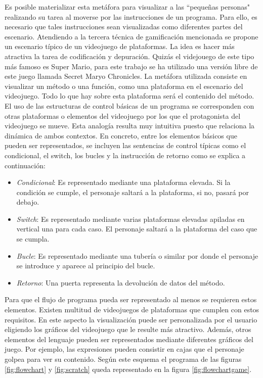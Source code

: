 \documentclass{llncs}
\begin{document}
Es posible materializar esta metáfora para visualizar a las ``pequeñas personas" realizando su tarea al moverse por las instrucciones de un programa. Para ello, es necesario que tales instrucciones sean visualizadas como diferentes partes del escenario. Atendiendo a la tercera técnica de gamificación mencionada se propone un escenario típico de un videojuego de plataformas. La idea es hacer más atractiva la tarea de codificación y depuración. Quizás el videjouego de este tipo más famoso es Super Mario, para este trabajo se ha utilizado una versión libre de este juego llamada Secret Maryo Chronicles. La metáfora utilizada consiste en visualizar un método o una función, como una plataforma en el escenario del videojuego. Todo lo que hay sobre esta plataforma será el contenido del método. El uso de las estructuras de control básicas de un programa se corresponden con otras plataformas o elementos del videojuego por los que el protagonista del videojuego se mueve. Esta analogía resulta muy intuitiva puesto que relaciona la dinámica de ambos contextos. En concreto, entre los elementos básicos que pueden ser representados, se incluyen las sentencias de control típicas como el condicional, el switch, los bucles y la instrucción de retorno como se explica a continuación: 

\begin{itemize}
\item {\em Condicional}: Es representado mediante una plataforma elevada. Si la condición se cumple, el personaje saltará a la plataforma, si no, pasará por debajo.
\item {\em Switch}: Es representado mediante varias plataformas elevadas apiladas en vertical una para cada caso. El personaje saltará a la plataforma del caso que se cumpla.
\item {\em Bucle}: Es representado mediante una tubería o similar por donde el personaje se introduce y aparece al principio del bucle.
\item {\em Retorno}: Una puerta representa la devolución de datos del método.
\end{itemize}

Para que el flujo de programa pueda ser representado al menos se requieren estos elementos. Existen multitud de videojuegos de plataformas que cumplen con estos requisitos. En este aspecto la visualización puede ser personalizada por el usuario eligiendo los gráficos del videojuego que le resulte más atractivo. Además, otros elementos del lenguaje pueden ser representados mediante diferentes gráficos del juego. Por ejemplo, las expresiones pueden consistir en cajas que el personaje golpea para ver su contenido. Según este esquema el programa de las figuras \ref{fig:flowchart} y \ref{fig:scratch} queda representado en la figura \ref{fig:flowchartgame}.
\end{document}
